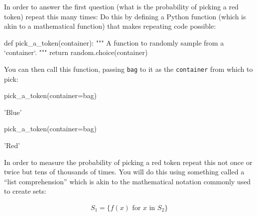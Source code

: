 \begin{pyin}
\end{pyin}





In order to answer the first question (what is the probability of picking a red
token) repeat this many times:
Do this by defining a Python function (which is akin to a mathematical
function) that makes repeating code possible:




\begin{pyin}
def pick_a_token(container):
    """
    A function to randomly sample from a `container`.
    """
    return random.choice(container)
\end{pyin}


You can then call this function, passing \texttt{bag} to it as the \texttt{container} from
which to pick:

\begin{pyin}
pick_a_token(container=bag)
\end{pyin}





\begin{raw}
'Blue'
\end{raw}









\begin{pyin}
pick_a_token(container=bag)
\end{pyin}





\begin{raw}
'Red'
\end{raw}






In order to measure the probability of picking a red token repeat
this not once or twice but tens of thousands of times. You will do this using
something called a ``list comprehension'' which is akin to the mathematical
notation commonly used to create sets:

\begin{equation*}
\begin{split}
    S_1 = \{f(x)\text{ for }x\text{ in }S_2\}
\end{split}
\end{equation*}

